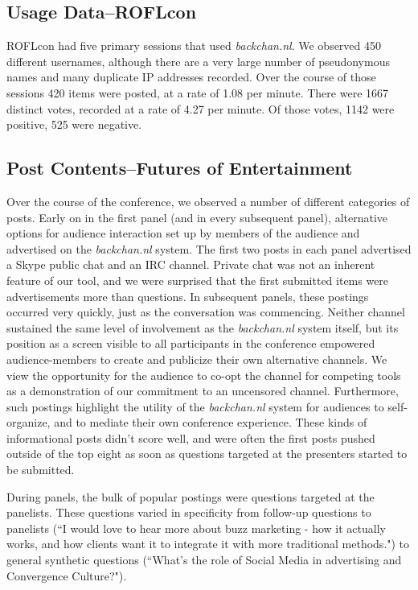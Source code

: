 \subsection{Usage Data--ROFLcon}
ROFLcon had five primary sessions that used \emph{backchan.nl}. We observed 450 different usernames, although there are a very large number of pseudonymous names and many duplicate IP addresses recorded. Over the course of those sessions 420 items were posted, at a rate of 1.08 per minute.
There were 1667 distinct votes, recorded at a rate of 4.27 per minute. Of those votes, 1142 were positive, 525 were negative. 



\subsection{Post Contents--Futures of Entertainment}

Over the course of the conference, we observed a number of different categories of posts. Early on in the first panel (and in every subsequent panel), alternative options for audience interaction set up by members of the audience and advertised on the \emph{backchan.nl} system. The first two posts in each panel advertised a Skype public chat and an IRC channel. Private chat was not an inherent feature of our tool, and we were surprised that the first submitted items were advertisements more than questions. In subsequent panels, these postings occurred very quickly, just as the conversation was commencing. Neither channel sustained the same level of involvement as the \emph{backchan.nl} system itself, but its position as a screen visible to all participants in the conference empowered audience-members to create and publicize their own alternative channels. We view the opportunity for the audience to co-opt the channel for competing tools as a demonstration of our commitment to an uncensored channel. Furthermore, such postings highlight the utility of the \emph{backchan.nl} system for audiences to self-organize, and to mediate their own conference experience. These kinds of informational posts didn't score well, and were often the first posts pushed outside of the top eight as soon as questions targeted at the presenters started to be submitted.

During panels, the bulk of popular postings were questions targeted at the panelists. These questions varied in specificity from follow-up questions to panelists (``I would love to hear more about buzz marketing - how it actually works, and how clients want it to integrate it with more traditional methods.") to general synthetic questions (``What's the role of Social Media in advertising and Convergence Culture?").

